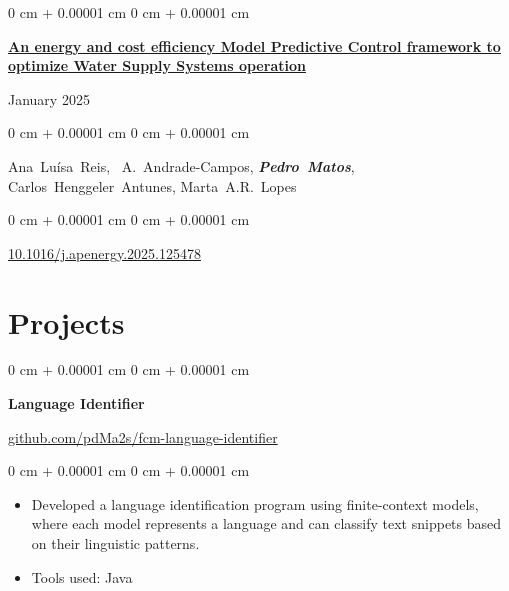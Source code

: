 \documentclass[10pt, letterpaper]{article}
\newenvironment{highlights}{
    \begin{itemize}[
        topsep=0.10 cm,
        parsep=0.10 cm,
        partopsep=0pt,
        itemsep=0pt,
        leftmargin=0 cm + 10pt
    ]
}{
    \end{itemize}
} %
\newenvironment{onecolentry}{
    \begin{adjustwidth}{
        0 cm + 0.00001 cm
    }{
        0 cm + 0.00001 cm
    }
}{
    \end{adjustwidth}
} %
\newenvironment{twocolentry}[2][]{
    \onecolentry
    \def\secondColumn{#2}
    \setcolumnwidth{\fill, 4.5 cm}
    \begin{paracol}{2}
}{
    \switchcolumn \raggedleft \secondColumn
    \end{paracol}
    \endonecolentry
} %
\newenvironment{twocolbigentry}[2][]{
    \onecolentry
    \def\secondColumn{#2}
    \setcolumnwidth{\fill, 7 cm}
    \begin{paracol}{2}
}{
    \switchcolumn \raggedleft \secondColumn
    \end{paracol}
    \endonecolentry
} %
\begin{document}
        \begin{samepage}
            \begin{twocolentry}{
                January 2025
            }
                \textbf{\href{https://doi.org/10.1016/j.apenergy.2025.125478}{An energy and cost efficiency Model Predictive Control framework to optimize Water Supply Systems operation}}
            \end{twocolentry}

            \vspace{0.10 cm}
            
            \begin{onecolentry}
                \mbox{Ana Luísa Reis}, \mbox{ A. Andrade-Campos}, \mbox{\textbf{\textit{Pedro Matos}}}, \mbox{Carlos Henggeler Antunes}, \mbox{Marta A.R. Lopes}
                        
            \end{onecolentry}

            \begin{onecolentry}
                \href{https://doi.org/10.1016/j.apenergy.2025.125478}{10.1016/j.apenergy.2025.125478}
            \end{onecolentry}
        
        \end{samepage}

    
    \section{Projects}
        
        \begin{twocolbigentry}{
            \href{https://github.com/pdMa2s/fcm-language-identifier}{github.com/pdMa2s/fcm-language-identifier}
        }
            \textbf{Language Identifier}
        \end{twocolbigentry}

        \vspace{0.10 cm}
        \begin{onecolentry}
            \begin{highlights}
                \item Developed a language identification program using finite-context models, where each model represents a language and can classify text snippets based on their linguistic patterns. 
                \item Tools used: Java
            \end{highlights}
        \end{onecolentry}
\end{document}
